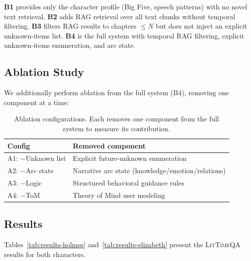 \documentclass[11pt,a4paper]{article}
\begin{document}
\noindent \textbf{B1} provides only the character profile (Big Five, speech patterns) with no novel text retrieval.
\textbf{B2} adds RAG retrieval over all text chunks without temporal filtering.
\textbf{B3} filters RAG results to chapters $\leq N$ but does not inject an explicit unknown-items list.
\textbf{B4} is the full system with temporal RAG filtering, explicit unknown-items enumeration, and arc state.

\subsection{Ablation Study}
\label{sec:ablation}

We additionally perform ablation from the full system (B4), removing one component at a time:

\begin{table}[t]
\centering
\small
\begin{tabular}{@{}ll@{}}
\toprule
\textbf{Config} & \textbf{Removed component} \\
\midrule
A1: $-$Unknown list & Explicit future-unknown enumeration \\
A2: $-$Arc state    & Narrative arc state (knowledge/emotion/relations) \\
A3: $-$Logic        & Structured behavioral guidance rules \\
A4: $-$ToM          & Theory of Mind user modeling \\
\bottomrule
\end{tabular}
\caption{Ablation configurations. Each removes one component from the full system to measure its contribution.}
\label{tab:ablations}
\end{table}

\subsection{Results}
\label{sec:results}

Tables~\ref{tab:results-holmes} and~\ref{tab:results-elizabeth} present the \textsc{LitTimeQA} results for both characters.
\end{document}
